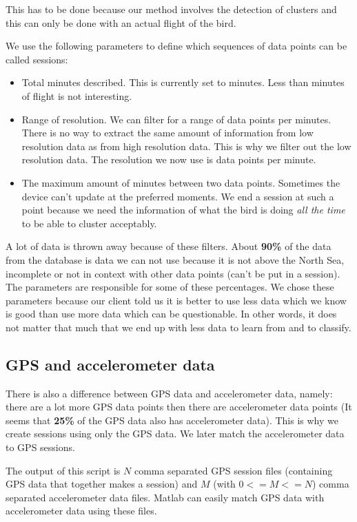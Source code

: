 This has to be done because our method involves the detection of clusters and this
can only be done with an actual flight of the bird. 

We use the following parameters to define which sequences of data points can be called sessions: 
\begin{itemize}
    \item Total minutes described. This is currently set to \minimumSessionLengthMinutes minutes. Less than \minimumSessionLengthMinutes minutes of flight is not interesting.
    \item Range of resolution. We can filter for a range of data points per minutes. There is
no way to extract the same amount of information from low resolution data as from high 
resolution data. This is why we filter out the low resolution data. The resolution 
we now use is \resolutionRange data points per minute.
    \item The maximum amount of minutes between two data points. Sometimes the device
can't update at the preferred moments. We end a session at such a point because we need
the information of what the bird is doing \emph{all the time} to be able to cluster 
acceptably. 
\end{itemize}

A lot of data is thrown away because of these filters. About \textbf{90\%} of the data 
from the database is data we can not use because it is not above the North Sea, incomplete
or not in context with other data points (can't be put in a session). The parameters are  
responsible for 
some of these percentages. We chose these parameters because our client told us it is better
to use less data which we know is good than use more data which can be questionable. In 
other words, it does not matter that much that we end up with less data to learn from and
to classify. 

\subsection{GPS and accelerometer data}
\label{subsec:gpsAndAccelerometerData}
There is also a difference between GPS data and accelerometer data, namely: there are a lot
more GPS data points then there are accelerometer data points
(It seems that \textbf{25\%} of the GPS data also has accelerometer data).
This is why we create 
sessions using only
the GPS data. We later match the accelerometer data to GPS sessions. 

The output of this
script is $N$ comma separated GPS session files (containing GPS data that together makes
a session) and $M$ (with $0 <= M <= N$) comma separated accelerometer data files. Matlab
can easily match GPS data with accelerometer data using these files. 

